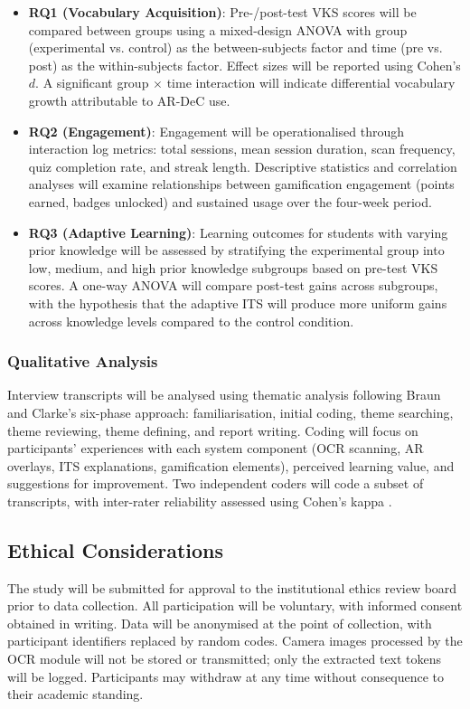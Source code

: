 \begin{itemize}
    \item \textbf{RQ1 (Vocabulary Acquisition)}: Pre-/post-test VKS scores will be compared between groups using a mixed-design ANOVA with group (experimental vs. control) as the between-subjects factor and time (pre vs. post) as the within-subjects factor. Effect sizes will be reported using Cohen's $d$. A significant group $\times$ time interaction will indicate differential vocabulary growth attributable to AR-DeC use.

    \item \textbf{RQ2 (Engagement)}: Engagement will be operationalised through interaction log metrics: total sessions, mean session duration, scan frequency, quiz completion rate, and streak length. Descriptive statistics and correlation analyses will examine relationships between gamification engagement (points earned, badges unlocked) and sustained usage over the four-week period.

    \item \textbf{RQ3 (Adaptive Learning)}: Learning outcomes for students with varying prior knowledge will be assessed by stratifying the experimental group into low, medium, and high prior knowledge subgroups based on pre-test VKS scores. A one-way ANOVA will compare post-test gains across subgroups, with the hypothesis that the adaptive ITS will produce more uniform gains across knowledge levels compared to the control condition.
\end{itemize}

\subsubsection{Qualitative Analysis}

Interview transcripts will be analysed using thematic analysis following Braun and Clarke's six-phase approach: familiarisation, initial coding, theme searching, theme reviewing, theme defining, and report writing. Coding will focus on participants' experiences with each system component (OCR scanning, AR overlays, ITS explanations, gamification elements), perceived learning value, and suggestions for improvement. Two independent coders will code a subset of transcripts, with inter-rater reliability assessed using Cohen's kappa \cite{cohen1960}.

\subsection{Ethical Considerations}
\label{subsec:ethics}

The study will be submitted for approval to the institutional ethics review board prior to data collection. All participation will be voluntary, with informed consent obtained in writing. Data will be anonymised at the point of collection, with participant identifiers replaced by random codes. Camera images processed by the OCR module will not be stored or transmitted; only the extracted text tokens will be logged. Participants may withdraw at any time without consequence to their academic standing.
